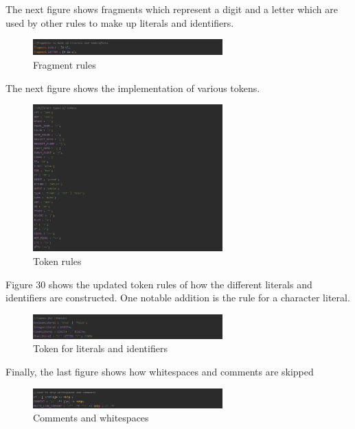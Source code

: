 \documentclass{article}
\begin{document}
					\noindent The next figure shows fragments which represent a digit and a letter which are used by other rules to make up literals and identifiers.
				
			
						\begin{figure}[H]
					\centering
			 			\includegraphics[width=0.65\textwidth]{antlrv1_5.png}
			  			\caption{Fragment rules}
			  			\label{fig:antlrv1_5}
					\end{figure}
					
					\noindent The next figure shows the implementation of various tokens.
				
						\begin{figure}[H]
					\centering
			 			\includegraphics[width=0.65\textwidth]{antlrv1_6.png}
			  			\caption{Token rules}
			  			\label{fig:antlrv1_6}
					\end{figure}
					
					\noindent Figure 30 shows the updated token rules of how the different literals and identifiers are constructed. One notable addition is the rule for a character literal.
				
			
						\begin{figure}[H]
					\centering
			 			\includegraphics[width=0.65\textwidth]{antlrv2_3.png}
			  			\caption{Token for literals and identifiers}
			  			\label{fig:antlrv2_3}
					\end{figure}
					
					\noindent Finally, the last figure shows how whitespaces and comments are skipped
				
			
						\begin{figure}[H]
					\centering
			 			\includegraphics[width=0.65\textwidth]{antlrv1_8.png}
			  			\caption{Comments and whitespaces}
			  			\label{fig:antlrv1_8}
					\end{figure}
					
\end{document}
